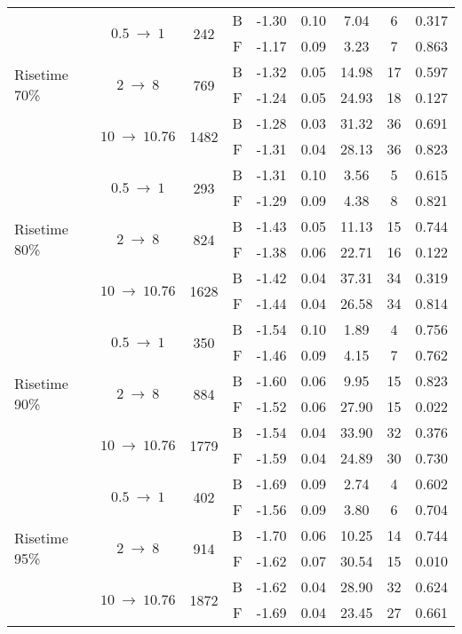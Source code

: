 \begin{table}
\begin{tabular}{l  c  c  c  r@{$~\pm~$}l  c  c  c }
				\multirow{6}{*}{Risetime 70\%}& \multirow{2}{*}{$0.5~\to~1$} & \multirow{2}{*}{242}	& B & -1.30 & 0.10 & 7.04 & 6 & 0.317\\
					& & & F & -1.17 & 0.09 & 3.23 & 7 & 0.863\\
				& \multirow{2}{*}{$2~\to~8$} & \multirow{2}{*}{769}	& B & -1.32 & 0.05 & 14.98 & 17 & 0.597\\
					& & & F & -1.24 & 0.05 & 24.93 & 18 & 0.127\\
				& \multirow{2}{*}{$10~\to~10.76$} & \multirow{2}{*}{1482}	& B & -1.28 & 0.03 & 31.32 & 36 & 0.691\\
					& & & F & -1.31 & 0.04 & 28.13 & 36 & 0.823\\
				\midrule
				
				\multirow{6}{*}{Risetime 80\%}& \multirow{2}{*}{$0.5~\to~1$} & \multirow{2}{*}{293}	& B & -1.31 & 0.10 & 3.56 & 5 & 0.615\\
					& & & F & -1.29 & 0.09 & 4.38 & 8 & 0.821\\
				& \multirow{2}{*}{$2~\to~8$} & \multirow{2}{*}{824}	& B & -1.43 & 0.05 & 11.13 & 15 & 0.744\\
					& & & F & -1.38 & 0.06 & 22.71 & 16 & 0.122\\
				& \multirow{2}{*}{$10~\to~10.76$} & \multirow{2}{*}{1628}	& B & -1.42 & 0.04 & 37.31 & 34 & 0.319\\
					& & & F & -1.44 & 0.04 & 26.58 & 34 & 0.814\\
				\midrule
				
				\multirow{6}{*}{Risetime 90\%}& \multirow{2}{*}{$0.5~\to~1$} & \multirow{2}{*}{350}	& B & -1.54 & 0.10 & 1.89 & 4 & 0.756\\
					& & & F & -1.46 & 0.09 & 4.15 & 7 & 0.762\\
				& \multirow{2}{*}{$2~\to~8$} & \multirow{2}{*}{884}	& B & -1.60 & 0.06 & 9.95 & 15 & 0.823\\
					& & & F & -1.52 & 0.06 & 27.90 & 15 & 0.022\\
				& \multirow{2}{*}{$10~\to~10.76$} & \multirow{2}{*}{1779}	& B & -1.54 & 0.04 & 33.90 & 32 & 0.376\\
					& & & F & -1.59 & 0.04 & 24.89 & 30 & 0.730\\
				\midrule
				
				\multirow{6}{*}{Risetime 95\%}& \multirow{2}{*}{$0.5~\to~1$} & \multirow{2}{*}{402}	& B & -1.69 & 0.09 & 2.74 & 4 & 0.602\\
					& & & F & -1.56 & 0.09 & 3.80 & 6 & 0.704\\
				& \multirow{2}{*}{$2~\to~8$} & \multirow{2}{*}{914}	& B & -1.70 & 0.06 & 10.25 & 14 & 0.744\\
					& & & F & -1.62 & 0.07 & 30.54 & 15 & 0.010\\
				& \multirow{2}{*}{$10~\to~10.76$} & \multirow{2}{*}{1872}	& B & -1.62 & 0.04 & 28.90 & 32 & 0.624\\
					& & & F & -1.69 & 0.04 & 23.45 & 27 & 0.661\\
				\midrule
				

\end{tabular}
\end{table}

